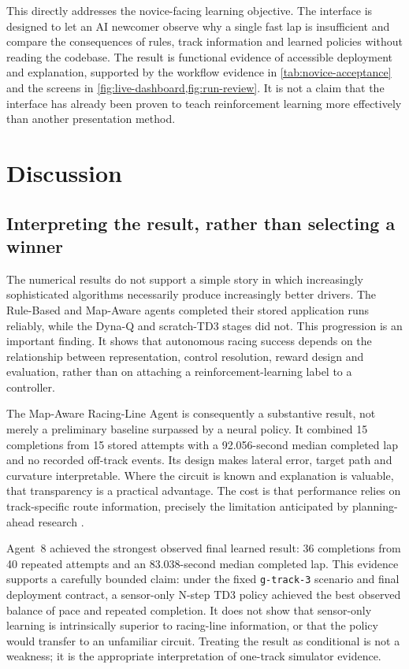 This directly addresses the novice-facing learning objective. The interface is designed to let an AI newcomer observe why a single fast lap is insufficient and compare the consequences of rules, track information and learned policies without reading the codebase. The result is functional evidence of accessible deployment and explanation, supported by the workflow evidence in \cref{tab:novice-acceptance} and the screens in \cref{fig:live-dashboard,fig:run-review}. It is not a claim that the interface has already been proven to teach reinforcement learning more effectively than another presentation method.


\section{Discussion}
\label{ch:discussion}

\subsection{Interpreting the result, rather than selecting a winner}

The numerical results do not support a simple story in which increasingly sophisticated algorithms necessarily produce increasingly better drivers. The Rule-Based and Map-Aware agents completed their stored application runs reliably, while the Dyna-Q and scratch-TD3 stages did not. This progression is an important finding. It shows that autonomous racing success depends on the relationship between representation, control resolution, reward design and evaluation, rather than on attaching a reinforcement-learning label to a controller.

The Map-Aware Racing-Line Agent is consequently a substantive result, not merely a preliminary baseline surpassed by a neural policy. It combined 15 completions from 15 stored attempts with a 92.056-second median completed lap and no recorded off-track events. Its design makes lateral error, target path and curvature interpretable. Where the circuit is known and explanation is valuable, that transparency is a practical advantage. The cost is that performance relies on track-specific route information, precisely the limitation anticipated by planning-ahead research \parencite{quadflieg2010}.

Agent~8 achieved the strongest observed final learned result: 36 completions from 40 repeated attempts and an 83.038-second median completed lap. This evidence supports a carefully bounded claim: under the fixed \texttt{g-track-3} scenario and final deployment contract, a sensor-only N-step TD3 policy achieved the best observed balance of pace and repeated completion. It does not show that sensor-only learning is intrinsically superior to racing-line information, or that the policy would transfer to an unfamiliar circuit. Treating the result as conditional is not a weakness; it is the appropriate interpretation of one-track simulator evidence.

